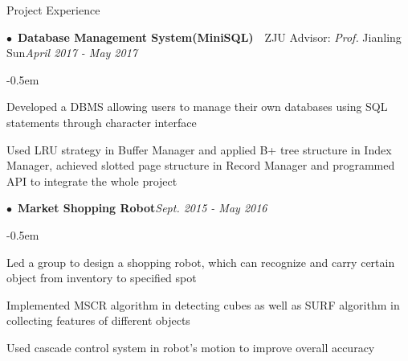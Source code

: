 \documentclass{resume} %
\begin{document}
\begin{rSection}{Project Experience}

\begin{spacing}{0.4}
$\bullet$~{\bf Database Management System(MiniSQL)}~~{ZJU Advisor: {\em Prof.} Jianling Sun}\hfill{\em April 2017 - May 2017}\smallskip\\
\end{spacing}
\begin{list}{--}{\leftmargin=1em}
	\itemsep -0.5em \vspace{-0.5em}
\item Developed a DBMS allowing users to manage their own databases using SQL statements through character interface
\item Used LRU strategy in Buffer Manager and applied B+ tree structure in Index Manager, achieved slotted page structure in Record Manager and programmed API to integrate the whole project

\end{list}




\begin{spacing}{0.4}
$\bullet$~{\bf Market Shopping Robot}\hfill{\em Sept. 2015 - May 2016}\smallskip\\
\end{spacing}
\begin{list}{--}{\leftmargin=1em}
	\itemsep -0.5em \vspace{-0.5em}
\item Led a group to design a shopping robot, which can recognize and carry certain object from inventory to specified spot
\item Implemented MSCR algorithm in detecting cubes as well as SURF algorithm in collecting features of different objects
\item Used cascade control system in robot’s motion to improve overall accuracy


\end{list}
\end{rSection}
\end{document}
